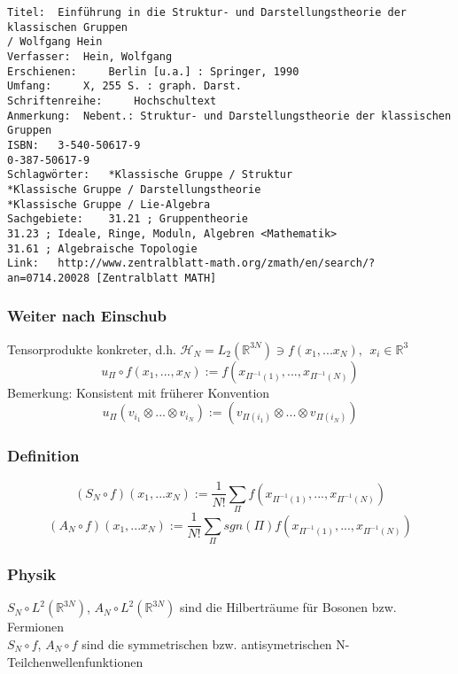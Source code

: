 \documentclass[twoside,a4paper]{scrartcl}
\renewcommand{\1}{\mathds{1}}
\begin{document}
\begin{description}
\begin{tiny}
\begin{verbatim}
Titel: 	Einführung in die Struktur- und Darstellungstheorie der klassischen Gruppen 
/ Wolfgang Hein
Verfasser: 	Hein, Wolfgang
Erschienen: 	Berlin [u.a.] : Springer, 1990
Umfang: 	X, 255 S. : graph. Darst.
Schriftenreihe: 	Hochschultext
Anmerkung: 	Nebent.: Struktur- und Darstellungstheorie der klassischen Gruppen
ISBN: 	3-540-50617-9
0-387-50617-9
Schlagwörter: 	*Klassische Gruppe / Struktur
*Klassische Gruppe / Darstellungstheorie
*Klassische Gruppe / Lie-Algebra
Sachgebiete: 	31.21 ; Gruppentheorie
31.23 ; Ideale, Ringe, Moduln, Algebren <Mathematik>
31.61 ; Algebraische Topologie
Link: 	http://www.zentralblatt-math.org/zmath/en/search/?an=0714.20028 [Zentralblatt MATH]
\end{verbatim}
\end{tiny}

 \end{description}

\subsubsection*{Weiter nach Einschub}
Tensorprodukte konkreter, d.h. $\mathcal H_N=L_2(\mathbb R^{3N}) \ni f(x_1,...x_N), \ \ x_i \in \mathbb R^3$
$$u_\Pi \circ f(x_1,...,x_N):=f(x_{\Pi^{-1}(1)},...,x_{\Pi^{-1}(N)})$$
Bemerkung: Konsistent mit früherer Konvention
$$u_\Pi (v_{i_1}\otimes ... \otimes v_{i_N}):=(v_{\Pi(i_1)}\otimes ... \otimes v_{\Pi(i_N)}) $$

\subsubsection*{Definition}
$$(S_N \circ f)(x_1,...x_N):=\frac{1}{N!}\sum_\Pi f(x_{\Pi^{-1}(1)},...,x_{\Pi^{-1}(N)})$$
$$(A_N \circ f)(x_1,...x_N):=\frac{1}{N!}\sum_\Pi sgn(\Pi) f(x_{\Pi^{-1}(1)},...,x_{\Pi^{-1}(N)})$$

\subsubsection*{Physik}
$S_N \circ L^2(\mathbb R^{3N})$, $A_N \circ L^2(\mathbb R^{3N})$ sind die Hilberträume für Bosonen bzw. Fermionen\\
$S_N \circ f$, $A_N \circ f$ sind die symmetrischen bzw. antisymetrischen N-Teilchenwellenfunktionen
\end{document}
